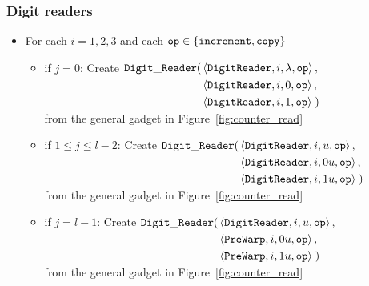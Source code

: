 \subsubsection{ Digit readers }

\begin{itemize}

\item For each $i = 1,2,3$ and each ${\tt op} \in \{{\tt increment}, {\tt copy} \}$

    \begin{itemize}
        \item if $j = 0$:
        Create
        $\begin{aligned}[t]
            {\tt Digit\_Reader}(& \left\langle {\tt DigitReader}, i, \lambda, {\tt op} \right\rangle, \\
                     & \left\langle {\tt DigitReader}, i, 0, {\tt op} \right\rangle, \\
                     & \left\langle {\tt DigitReader}, i, 1, {\tt op} \right\rangle \;)
        \end{aligned}$\\
        from the general gadget in Figure~\ref{fig:counter_read}

        \item if $1 \leqslant j \leqslant l -2$:
        Create
        $\begin{aligned}[t]
        {\tt Digit\_Reader}(& \left\langle {\tt DigitReader}, i, u, {\tt op} \right\rangle, \\
                 & \left\langle {\tt DigitReader}, i, 0u, {\tt op} \right\rangle, \\
                 & \left\langle {\tt DigitReader}, i, 1u, {\tt op} \right\rangle \;)
        \end{aligned}$\\
        from the general gadget in Figure~\ref{fig:counter_read}

        \item if $j = l - 1$:
        Create
        $\begin{aligned}[t]
            {\tt Digit\_Reader}(& \left\langle {\tt DigitReader}, i, u, {\tt op} \right\rangle, \\
                     & \left\langle {\tt PreWarp}, i, 0u, {\tt op} \right\rangle, \\
                     & \left\langle {\tt PreWarp}, i, 1u, {\tt op} \right\rangle \;)
        \end{aligned}$\\
        from the general gadget in Figure~\ref{fig:counter_read}

    \end{itemize}


\end{itemize}

